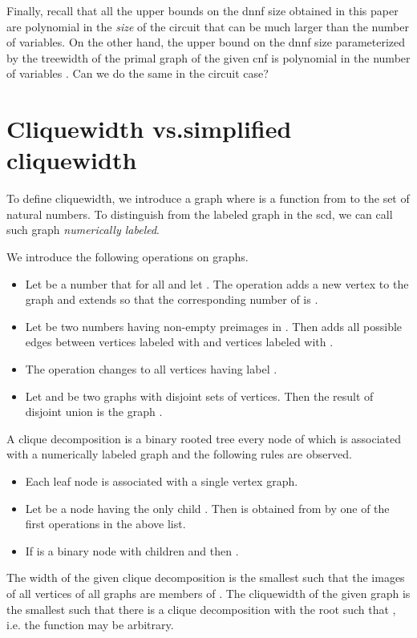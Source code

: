 \documentclass{llncs}
\begin{document}
Finally, recall that all the upper bounds on the {\sc dnnf} size obtained in this paper are polynomial in the \emph{size} of the circuit
that can be much larger than the number of variables. On the other hand, the upper bound on the {\sc dnnf} size 
parameterized by the treewidth of the primal graph of the given {\sc cnf} is polynomial in the number of variables \cite{DarwicheJACM}. 
Can we do the same in the circuit case? 


\appendix
\section{Cliquewidth vs.simplified cliquewidth}
To define cliquewidth, we introduce a graph  where  is a function
from  to the set of natural numbers. 
To distinguish from the labeled graph in the {\sc scd}, we can call such graph
\emph{numerically labeled}.

We introduce the following operations on graphs.
\begin{itemize}
\item Let  be a number that   for all 
and let . The operation  adds a new vertex  to the graph 
and extends  so that the corresponding number of  is . 
\item Let  be two numbers having non-empty preimages in .
Then  adds all possible edges between vertices labeled with 
and vertices labeled with .
\item The operation  changes to  all vertices having label .
\item Let  and  be two graphs with disjoint
sets of vertices. Then the result of disjoint union  is the
graph .
\end{itemize}

A clique decomposition is a binary rooted tree  every node of which is 
associated with a numerically labeled  graph and the following rules are observed.
\begin{itemize}
\item Each leaf node is associated with a single vertex graph.
\item Let  be a node having the only child . Then  is obtained
from  by one of the first  operations in the above list.
\item If  is a binary node with children  and  then .
\end{itemize}

The width of the given clique decomposition is the smallest  such that the images
of all vertices of all graphs  are members of .
The cliquewidth of the given graph  is the smallest  such that there is a clique
decomposition  with the root  such that , i.e. the function
 may be arbitrary.
\end{document}
